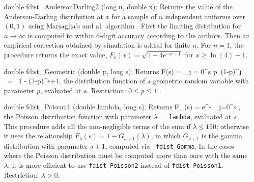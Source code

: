double fdist_AndersonDarling2 (long n, double x);
\endcode
 \tab Returns the value of the Anderson-Darling distribution at $x$
  for a sample of $n$ independent uniforms over $(0,1)$ using Marsaglia's
  and al. algorithm \cite{tMAR04a}. First the limiting distribution
  for $n\to\infty$ is computed to within 6-digit accuracy according to the
  authors. Then an empirical correction obtained by simulation is added
  for finite $n$.
  For $n=1$, the procedure returns the exact value,
  $F_1(x) = \sqrt{1 - 4e^{-x-1}}$ for $x\ge \ln(4) - 1$.
 \endtab




\code

double fdist_Geometric (double p, long s);
\endcode
  \tab Returns
  \eq
   F(s) = \sum_{j = 0}^s p\, (1-p)^{j} ~=~ 1 - (1-p)^{s+1},
  \endeq
  the distribution function of a geometric random variable with
  parameter $p$, evaluated at $s$.
  Restriction: $0 \le p \le 1$.
 \endtab
\code


double fdist_Poisson1 (double lambda, long s);
\endcode
  \tab  Returns
  \eq
    F_\lambda(s) =  e^{-\lambda} \sum_{j=0}^s\; ,
  \endeq
  the Poisson distribution function
  with parameter $\lambda =$ {\tt lambda}, evaluated at $s$.
\ifdetailed
  This procedure adds all the non-negligible terms of the sum
  if $\lambda \le 150$; otherwise it uses the relationship
  $F_\lambda(s) = 1 - G_{s + 1}(\lambda)$, in which $G_{s+1}$ is the
  gamma distribution with parameter $s+1$, computed via {\tt
  fdist\_Gamma}.
\fi
  In the cases where the Poisson distribution must be computed more than
  once with the same $\lambda$, %
  it is more efficient to use
  {\tt fdist\_Poisson2} instead of {\tt fdist\_Poisson1}.
  Restriction: $\lambda > 0$.
 \endtab
\code


